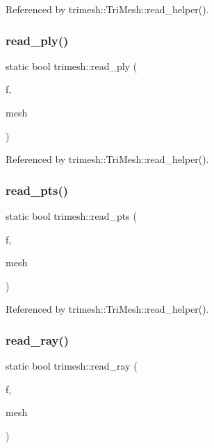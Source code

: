Referenced by trimesh\+::\+Tri\+Mesh\+::read\+\_\+helper().

\mbox{\label{namespacetrimesh_ad0cf7ab06d07c0569c9a7eb832ff114a}} 
\subsubsection{\texorpdfstring{read\+\_\+ply()}{read\_ply()}}
{\footnotesize\ttfamily static bool trimesh\+::read\+\_\+ply (\begin{DoxyParamCaption}\item[{F\+I\+LE $\ast$}]{f,  }\item[{\hyperlink{classtrimesh_1_1TriMesh}{Tri\+Mesh} $\ast$}]{mesh }\end{DoxyParamCaption})\hspace{0.3cm}{\ttfamily [static]}}



Referenced by trimesh\+::\+Tri\+Mesh\+::read\+\_\+helper().

\mbox{\label{namespacetrimesh_a964f33d0b4d230bcdab3f3fc73946fa7}} 
\subsubsection{\texorpdfstring{read\+\_\+pts()}{read\_pts()}}
{\footnotesize\ttfamily static bool trimesh\+::read\+\_\+pts (\begin{DoxyParamCaption}\item[{F\+I\+LE $\ast$}]{f,  }\item[{\hyperlink{classtrimesh_1_1TriMesh}{Tri\+Mesh} $\ast$}]{mesh }\end{DoxyParamCaption})\hspace{0.3cm}{\ttfamily [static]}}



Referenced by trimesh\+::\+Tri\+Mesh\+::read\+\_\+helper().

\mbox{\label{namespacetrimesh_a8a73e582eb0a3e4df256a4eb7e226cff}} 
\subsubsection{\texorpdfstring{read\+\_\+ray()}{read\_ray()}}
{\footnotesize\ttfamily static bool trimesh\+::read\+\_\+ray (\begin{DoxyParamCaption}\item[{F\+I\+LE $\ast$}]{f,  }\item[{\hyperlink{classtrimesh_1_1TriMesh}{Tri\+Mesh} $\ast$}]{mesh }\end{DoxyParamCaption})\hspace{0.3cm}{\ttfamily [static]}}



